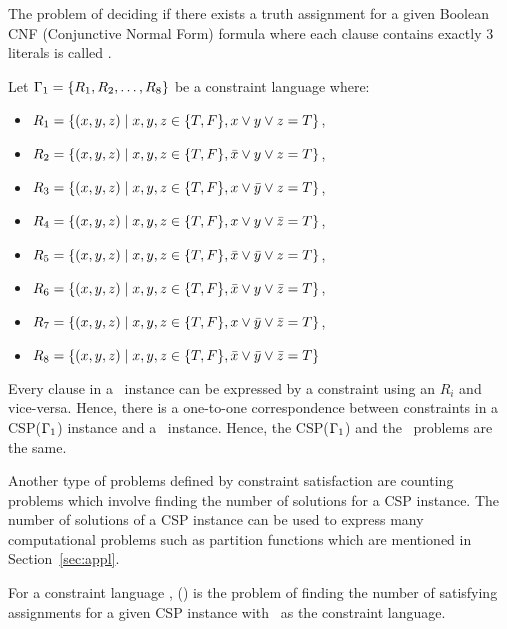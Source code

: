 \begin{example}[\tsat]\label{exm:3sat}
The problem of deciding if there exists a truth assignment for a 
given Boolean CNF (Conjunctive Normal Form) formula where each
clause contains exactly 3 literals is called \tsat\@.

Let \(\Gamma_1=\{{R_1,R_2,\dotsc, R_8}\}\) be a constraint language where:
\begin{itemize}
\item \(R_1=\{(x,y,z)\mid x,y,z\in \{{T,F}\}, x \lor y \lor z = T\}\), 
\item \(R_2=\{(x,y,z)\mid x,y,z\in \{{T,F}\}, \bar x \lor y \lor z = T\}\), 
\item \(R_3=\{(x,y,z)\mid x,y,z\in \{{T,F}\}, x \lor \bar y \lor z = T\}\), 
\item \(R_4=\{(x,y,z)\mid x,y,z\in \{{T,F}\}, x \lor y \lor \bar z = T\}\), 
\item \(R_5=\{(x,y,z)\mid x,y,z\in \{{T,F}\}, \bar x \lor \bar y \lor z = T\}\), 
\item \(R_6=\{(x,y,z)\mid x,y,z\in \{{T,F}\}, \bar x \lor y \lor \bar z = T\}\), 
\item \(R_7=\{(x,y,z)\mid x,y,z\in \{{T,F}\}, x \lor \bar y \lor \bar z = T\}\), 
\item \(R_8=\{(x,y,z)\mid x,y,z\in \{{T,F}\}, \bar x \lor \bar y \lor \bar z = T\}\)
\end{itemize}

Every clause in a \tsat\ instance can be expressed by a constraint using an \(R_i\) 
and vice-versa. Hence, there is a one-to-one correspondence between constraints 
in a CSP(\(\Gamma_1\)) instance and a \tsat\ instance. Hence,
the CSP(\(\Gamma_1\)) and the \tsat\ problems are the same.
\end{example}


Another type of problems defined by constraint satisfaction are
counting problems which involve finding the number of solutions for a CSP instance.
The number of solutions of a CSP instance can be used to express many computational problems
such as partition functions which are mentioned in Section~\ref{sec:appl}.

\begin{defi}[\ccsp(\mrelset)] 
For a constraint language \mrelset,
\ccsp(\mrelset) is the problem of finding the number of satisfying assignments for a
given CSP instance with \mrelset\ as the constraint language.
\end{defi}

